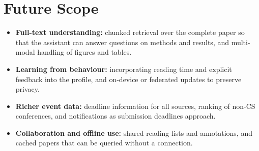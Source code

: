 \documentclass[conference]{IEEEtran}
\begin{document}
\section{Future Scope}
\begin{itemize}
    \item \textbf{Full-text understanding:} chunked retrieval over the complete paper so that the assistant can answer questions on methods and results, and multi-modal handling of figures and tables.
    \item \textbf{Learning from behaviour:} incorporating reading time and explicit feedback into the profile, and on-device or federated updates to preserve privacy.
    \item \textbf{Richer event data:} deadline information for all sources, ranking of non-CS conferences, and notifications as submission deadlines approach.
    \item \textbf{Collaboration and offline use:} shared reading lists and annotations, and cached papers that can be queried without a connection.
\end{itemize}
\end{document}
